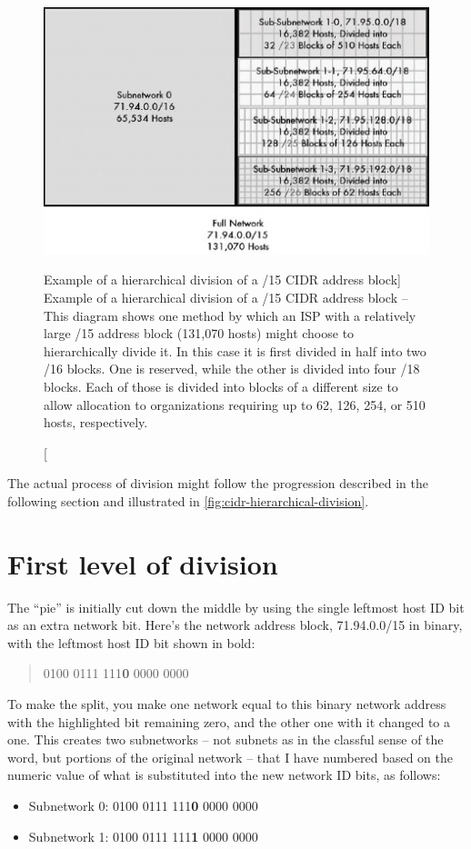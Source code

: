 \begin{figure}
   \centering
   \includegraphics[width=.7\textwidth]{images/isp-divide-15.jpg}
   \caption
      [Example of a hierarchical division of a /15 CIDR address block]
      {Example of a hierarchical division of a /15 CIDR address block --
      This diagram shows one method by which an ISP with a relatively large /15 address block (131,070 hosts) might choose to hierarchically divide it.
      In this case it is first divided in half into two /16 blocks.
      One is reserved, while the other is divided into four /18 blocks.
      Each  of those is divided into blocks of a different size to allow allocation to organizations requiring up to 62, 126, 254, or 510 hosts, respectively.}
   \label{fig:isp-divide-15}
\end{figure}


The actual process of division might follow the progression described in the following section and illustrated in \cref{fig:cidr-hierarchical-division}.



\section{First level of division}

The ``pie'' is initially cut down the middle by using the single leftmost host ID bit as an extra network bit.
Here's the network address block, 71.94.0.0/15 in binary, with the leftmost host ID bit shown in bold:
\begin{quote}
0100 0111 111\textbf{0} 0000 0000
\end{quote}


To make the split, you make one network equal to this binary network
address with the highlighted bit remaining zero, and the other one with
it changed to a one. This creates two subnetworks -- not subnets as in
the classful sense of the word, but portions of the original
network -- that I have numbered based on the numeric value of what is
substituted into the new network ID bits, as follows:
\begin{itemize}
   \item Subnetwork 0: 0100 0111 111\textbf{0} 0000 0000
   \item Subnetwork 1: 0100 0111 111\textbf{1} 0000 0000
\end{itemize}

